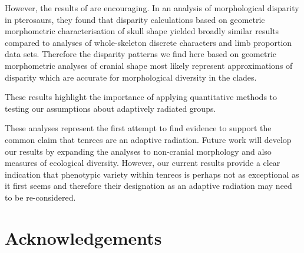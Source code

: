 \documentclass[12pt,a4paper]{article}
\begin{document}
	However, the results of \citep{Foth2012} are encouraging. In an analysis of morphological disparity in pterosaurs, they found that disparity calculations based on geometric morphometric characterisation of skull shape yielded broadly similar results compared to analyses of whole-skeleton discrete characters and limb proportion data sets. Therefore the disparity patterns we find here based on geometric morphometric analyses of cranial shape most likely represent approximations of disparity which are accurate for morphological diversity in the clades. 






	These results highlight the importance of applying quantitative methods to testing our assumptions about adaptively radiated groups. 


	These analyses represent the first attempt to find evidence to support the common claim that tenrecs are an adaptive radiation. Future work will develop our results by expanding the analyses to non-cranial morphology and also measures of ecological diversity. However, our current results provide a clear indication that phenotypic variety within tenrecs is perhaps not as exceptional as it first seems and therefore their designation as an adaptive radiation may need to be re-considered.




\section*{Acknowledgements}
\end{document}

